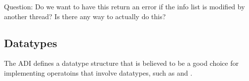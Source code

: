 \documentclass{article}
\begin{document}
\subsubsection{}
\subsubsection{}
\subsubsection{}
\subsubsection{}
\subsubsection{}
\subsubsection{}
\subsubsection{}
Question:  Do we want to have this return an error if the info list is 
modified by another thread?  Is there any way to actually do this?

\subsubsection{}
\subsubsection{}


\subsection{Datatypes}
The ADI defines a datatype structure that is believed to be a good
choice for implementing operatoins that involve datatypes, such as
 and .

\subsubsection{}
\end{document}
